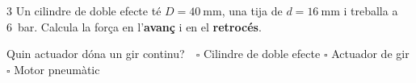 \begin{exercici}{3}
Un cilindre de doble efecte té $D = \SI{40}{\milli\meter}$, una tija de $d = \SI{16}{\milli\meter}$ i treballa a \SI{6}{\bar}. Calcula la força en l'\textbf{avanç} i en el \textbf{retrocés}.
\end{exercici}

\begin{comprova}
Quin actuador dóna un gir continu?\ \ $\square$ Cilindre de doble efecte \quad $\square$ Actuador de gir \quad $\square$ Motor pneumàtic
\end{comprova}

